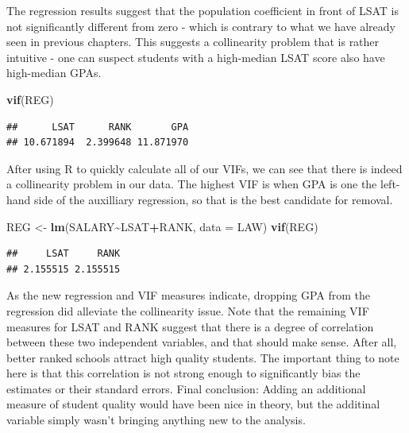 \documentclass[
]{book}
\newenvironment{Shaded}{\begin{snugshade}}{\end{snugshade}}
\newcommand{\AttributeTok}[1]{\textcolor[rgb]{0.13,0.29,0.53}{#1}}
\newcommand{\FunctionTok}[1]{\textcolor[rgb]{0.13,0.29,0.53}{\textbf{#1}}}
\newcommand{\NormalTok}[1]{#1}
\newcommand{\OtherTok}[1]{\textcolor[rgb]{0.56,0.35,0.01}{#1}}
\newcommand{\SpecialCharTok}[1]{\textcolor[rgb]{0.81,0.36,0.00}{\textbf{#1}}}
\begin{document}
The regression results suggest that the population coefficient in front of LSAT is not significantly different from zero - which is contrary to what we have already seen in previous chapters. This suggests a collinearity problem that is rather intuitive - one can suspect students with a high-median LSAT score also have high-median GPAs.

\begin{Shaded}
\begin{Highlighting}[]
\FunctionTok{vif}\NormalTok{(REG)}
\end{Highlighting}
\end{Shaded}

\begin{verbatim}
##      LSAT      RANK       GPA 
## 10.671894  2.399648 11.871970
\end{verbatim}

After using R to quickly calculate all of our VIFs, we can see that there is indeed a collinearity problem in our data. The highest VIF is when GPA is one the left-hand side of the auxilliary regression, so that is the best candidate for removal.

\begin{Shaded}
\begin{Highlighting}[]
\NormalTok{REG }\OtherTok{\textless{}{-}} \FunctionTok{lm}\NormalTok{(SALARY}\SpecialCharTok{\textasciitilde{}}\NormalTok{LSAT}\SpecialCharTok{+}\NormalTok{RANK, }\AttributeTok{data =}\NormalTok{ LAW)}
\FunctionTok{vif}\NormalTok{(REG)}
\end{Highlighting}
\end{Shaded}

\begin{verbatim}
##     LSAT     RANK 
## 2.155515 2.155515
\end{verbatim}

As the new regression and VIF measures indicate, dropping GPA from the regression did alleviate the collinearity issue. Note that the remaining VIF measures for LSAT and RANK suggest that there is a degree of correlation between these two independent variables, and that should make sense. After all, better ranked schools attract high quality students. The important thing to note here is that this correlation is not strong enough to significantly bias the estimates or their standard errors. Final conclusion: Adding an additional measure of student quality would have been nice in theory, but the additinal variable simply wasn't bringing anything new to the analysis.
\end{document}
